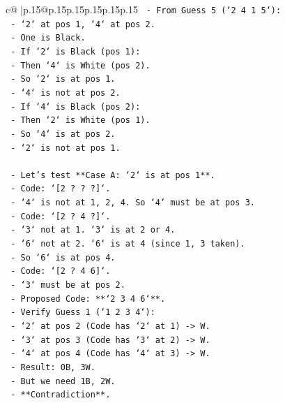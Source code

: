 \documentclass{article}
\begin{document}
{\begin{supertabular}{c@{$\;$}|p{.15\linewidth}@{}p{.15\linewidth}p{.15\linewidth}p{.15\linewidth}p{.15\linewidth}p{.15\linewidth}}
{{{\texttt{    {-} From Guess 5 (`2 4 1 5`):} \\
\texttt{        {-} `2` at pos 1, `4` at pos 2.} \\
\texttt{        {-} One is Black.} \\
\texttt{        {-} If `2` is Black (pos 1):} \\
\texttt{            {-} Then `4` is White (pos 2).} \\
\texttt{            {-} So `2` is at pos 1.} \\
\texttt{            {-} `4` is not at pos 2.} \\
\texttt{        {-} If `4` is Black (pos 2):} \\
\texttt{            {-} Then `2` is White (pos 1).} \\
\texttt{            {-} So `4` is at pos 2.} \\
\texttt{            {-} `2` is not at pos 1.} \\
\\ 
\texttt{    {-} Let's test **Case A: `2` is at pos 1**.} \\
\texttt{        {-} Code: `{[}2 ? ? ?{]}`.} \\
\texttt{        {-} `4` is not at 1, 2, 4. So `4` must be at pos 3.} \\
\texttt{        {-} Code: `{[}2 ? 4 ?{]}`.} \\
\texttt{        {-} `3` not at 1. `3` is at 2 or 4.} \\
\texttt{        {-} `6` not at 2. `6` is at 4 (since 1, 3 taken).} \\
\texttt{        {-} So `6` is at pos 4.} \\
\texttt{        {-} Code: `{[}2 ? 4 6{]}`.} \\
\texttt{        {-} `3` must be at pos 2.} \\
\texttt{        {-} Proposed Code: **`2 3 4 6`**.} \\
\texttt{        {-} Verify Guess 1 (`1 2 3 4`):} \\
\texttt{            {-} `2` at pos 2 (Code has `2` at 1) {-}> W.} \\
\texttt{            {-} `3` at pos 3 (Code has `3` at 2) {-}> W.} \\
\texttt{            {-} `4` at pos 4 (Code has `4` at 3) {-}> W.} \\
\texttt{            {-} Result: 0B, 3W.} \\
\texttt{            {-} But we need 1B, 2W.} \\
\texttt{            {-} **Contradiction**.} \\
}}}
\end{supertabular}}
\end{document}
